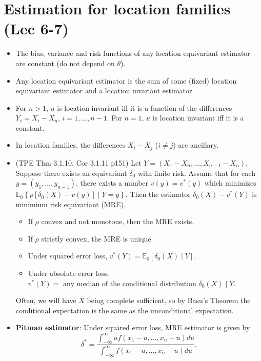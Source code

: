 \documentclass[twoside]{article}
\newcommand\bbE{\mathbb{E}}
\newcommand\dlt{\delta}
\def\t{\theta}
\begin{document}
\section*{Estimation for location families (Lec 6-7)}
\begin{itemize}
\item The bias, variance and risk functions of any location equivariant estimator are constant (do not depend on $\t$).

\item Any location equivariant estimator is the sum of some (fixed) location equivariant estimator and a location invariant estimator.

\item For $n > 1$, $u$ is location invariant iff it is a function of the differences $Y_i = X_i - X_n$, $i = 1, \dots, n-1$. For $n = 1$, $u$ is location invariant iff it is a constant.

\item In location families, the differences $X_i - X_j$ ($i \neq j$) are ancillary.

\item (TPE Thm 3.1.10, Cor 3.1.11 p151) Let $Y = (X_1 - X_n, \dots, X_{n-1} - X_n)$. Suppose there exists an equivariant $\dlt_0$ with finite risk. Assume that for each $y = (y_1, \dots, y_{n-1})$, there exists a number $v(y) = v^*(y)$ which minimizes $\bbE_0 \left\{ \rho[\dlt_0(X) - v(y)] \mid Y = y \right\}$. Then the estimator $\dlt_0(X) - v^*(Y)$ is minimium risk equivariant (MRE).
\begin{itemize}
\item If $\rho$ convex and not monotone, then the MRE exists.
\item If $\rho$ strictly convex, the MRE is unique.
\item Under squared error loss, $v^*(Y) = \bbE_0 [\dlt_0(X) \mid Y]$.
\item Under absolute error loss, $v^*(Y) = \text{ any median of the conditional distribution } \dlt_0(X) \mid Y$.
\end{itemize}
Often, we will have $X$ being complete sufficient, so by Basu's Theorem the conditional expectation is the same as the unconditional expectation.

\item \textbf{Pitman estimator}: Under squared error loss, MRE estimator is given by
\begin{equation*}
\dlt^* = \frac{\int_{-\infty}^\infty u f(x_1 - u, \dots, x_n - u) du}{\int_{-\infty}^\infty f(x_1 - u, \dots, x_n - u) du}.
\end{equation*}


\end{itemize}
\end{document}
